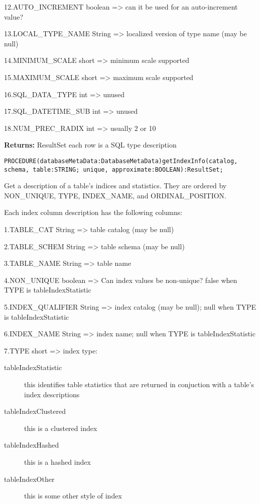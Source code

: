 12.AUTO\_INCREMENT boolean => can it be used for an auto-increment value? 

13.LOCAL\_TYPE\_NAME String => localized version of type name (may be null) 

14.MINIMUM\_SCALE short => minimum scale supported 

15.MAXIMUM\_SCALE short => maximum scale supported 

16.SQL\_DATA\_TYPE int => unused 

17.SQL\_DATETIME\_SUB int => unused 

18.NUM\_PREC\_RADIX int => usually 2 or 10 


{\bf Returns: } 
ResultSet each row is a SQL type description 




\verb'PROCEDURE(databaseMetaData:DatabaseMetaData)getIndexInfo(catalog, schema, table:STRING; unique, approximate:BOOLEAN):ResultSet;'



Get a description of a table's indices and statistics. They are ordered by NON\_UNIQUE, TYPE, INDEX\_NAME, and ORDINAL\_POSITION. 

Each index column description has the following columns: 

1.TABLE\_CAT String => table catalog (may be null) 

2.TABLE\_SCHEM String => table schema (may be null) 

3.TABLE\_NAME String => table name 

4.NON\_UNIQUE boolean => Can index values be non-unique? false when TYPE is tableIndexStatistic 

5.INDEX\_QUALIFIER String => index catalog (may be null); null when TYPE is tableIndexStatistic 

6.INDEX\_NAME String => index name; null when TYPE is tableIndexStatistic 

7.TYPE short => index type: 
\begin{description}
\item[tableIndexStatistic] this identifies table statistics that are returned in conjuction with a table's index descriptions 
\item[tableIndexClustered] this is a clustered index 
\item[tableIndexHashed] this is a hashed index 
\item[tableIndexOther] this is some other style of index 
\end{description}

